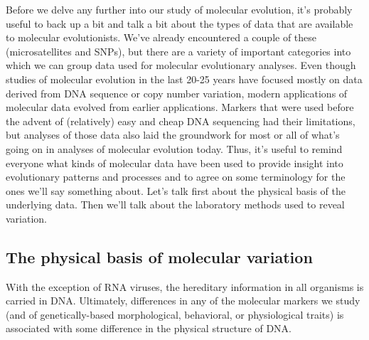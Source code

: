 \documentclass[12pt]{article}
\begin{document}
Before we delve any further into our study of molecular evolution,
it's probably useful to back up a bit and talk a bit about the types
of data that are available to molecular evolutionists. We've already
encountered a couple of these (microsatellites and SNPs), but there
are a variety of important categories into which we can group data
used for molecular evolutionary analyses. Even though studies of
molecular evolution in the last 20-25 years have focused mostly on
data derived from DNA sequence or copy number variation, modern
applications of molecular data evolved from earlier
applications. Markers that were used before the advent of (relatively)
easy and cheap DNA sequencing had their limitations, but analyses of
those data also laid the groundwork for most or all of what's going on
in analyses of molecular evolution today. Thus, it's useful to remind
everyone what kinds of molecular data have been used to provide
insight into evolutionary patterns and processes and to agree on some
terminology for the ones we'll say something about. Let's talk first
about the physical basis of the underlying data. Then we'll talk about
the laboratory methods used to reveal variation.

\subsection*{The physical basis of molecular variation}

With the exception of RNA viruses, the hereditary information in all
organisms is carried in DNA. Ultimately, differences in any of the
molecular markers we study (and of genetically-based morphological,
behavioral, or physiological traits) is associated with some
difference in the physical structure of DNA.
\end{document}
